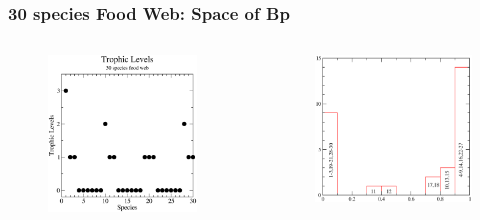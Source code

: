 \documentclass[xcolor=x11names,compress]{beamer}
\renewcommand{\(}{\begin{columns}}
\renewcommand{\)}{\end{columns}}
\newcommand{\<}[1]{\begin{column}{#1}}
\renewcommand{\>}{\end{column}}
\begin{document}
\begin{frame}
\frametitle{30 species Food Web: Space of Bp}
\begin{columns}
  \begin{column}{0.5\textwidth}
   \begin{figure}
	\includegraphics[width=0.9\textwidth]{./TrophicLevels_30species}
   \end{figure}
  \end{column}

  \begin{column}{0.5\textwidth}
   \begin{figure}
	\includegraphics[width=1.0\textwidth]{./BP_at_s17_st71}
   \end{figure}
  \end{column}
\end{columns}
\end{frame}
\end{document}
